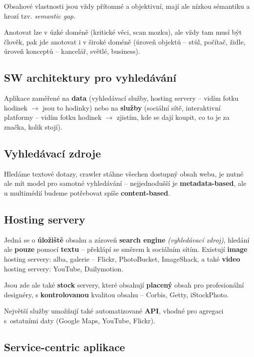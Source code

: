 Obsahové vlastnosti jsou vždy přítomné a objektivní, mají ale nízkou sémantiku a hrozí tzv. \textit{semantic gap}.

Anotovat lze v úzké doméně (kritické věci, scan mozku), ale vždy tam musí být člověk, pak jde anotovat i v široké doméně (úroveň objektů -- stůl, počítač, židle, úroveň konceptů -- kancelář, světlé, business).

\subsection{SW architektury pro vyhledávání}

Aplikace zaměřené na \textbf{data} (vyhledávací služby, hosting servery -- vidím fotku hodinek $\to$ jsou to hodinky) nebo na \textbf{služby} (sociální sítě, interaktivní platformy -- vidím fotku hodinek $\to$ zjistím, kde se dají koupit, co to je za značka, kolik stojí).

\subsection{Vyhledávací zdroje}

Hledáme textové dotazy, crawler stáhne všechen dostupný obsah webu, je nutné ale mít model pro samotné vyhledávání -- nejjednodušší je \textbf{metadata-based}, ale u multimédií budeme potřebovat spíše \textbf{content-based}.

\subsection{Hosting servery}

Jedná se o \textbf{úložiště} obsahu a zároveň \textbf{search engine} \textit{(vyhledávací zdroj)}, hledání ale \textbf{pouze} pomocí \textbf{textu} -- překlápí se směrem k sociálním sítím. Existují \textbf{image} hosting servery: alba, galerie -- Flickr, PhotoBucket, ImageShack, a také \textbf{video} hosting servery: YouTube, Dailymotion.

Jsou zde ale také \textbf{stock} servery, které obsahují \textbf{placený} obsah pro profesionální designéry, s \textbf{kontrolovanou} kvalitou obsahu -- Corbis, Getty, iStockPhoto.

Největší služby umožňují také automatizované \textbf{API}, vhodné pro agregaci s~ostatními daty (Google Maps, YouTube, Flickr).

\subsection{Service-centric aplikace}

